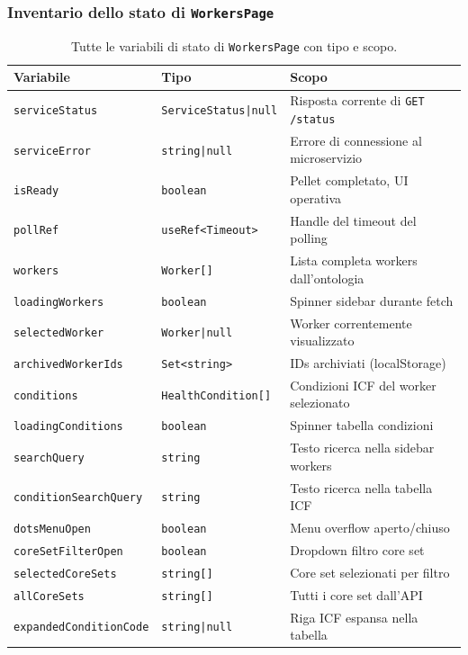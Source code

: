 \documentclass[a4paper,12pt]{article}
\begin{document}
\subsubsection{Inventario dello stato di \texttt{WorkersPage}}

\begin{table}[H]
\centering\small
\caption{Tutte le variabili di stato di \texttt{WorkersPage} con tipo e scopo.}
\begin{tabular}{L{4.8cm} L{3.5cm} L{4.7cm}}
\toprule
\textbf{Variabile} & \textbf{Tipo} & \textbf{Scopo} \\
\midrule
\texttt{serviceStatus} & \texttt{ServiceStatus|null} & Risposta corrente di \texttt{GET /status} \\
\texttt{serviceError} & \texttt{string|null} & Errore di connessione al microservizio \\
\texttt{isReady} & \texttt{boolean} & Pellet completato, UI operativa \\
\texttt{pollRef} & \texttt{useRef<Timeout>} & Handle del timeout del polling \\
\texttt{workers} & \texttt{Worker[]} & Lista completa workers dall'ontologia \\
\texttt{loadingWorkers} & \texttt{boolean} & Spinner sidebar durante fetch \\
\texttt{selectedWorker} & \texttt{Worker|null} & Worker correntemente visualizzato \\
\texttt{archivedWorkerIds} & \texttt{Set<string>} & IDs archiviati (localStorage) \\
\texttt{conditions} & \texttt{HealthCondition[]} & Condizioni ICF del worker selezionato \\
\texttt{loadingConditions} & \texttt{boolean} & Spinner tabella condizioni \\
\texttt{searchQuery} & \texttt{string} & Testo ricerca nella sidebar workers \\
\texttt{conditionSearchQuery} & \texttt{string} & Testo ricerca nella tabella ICF \\
\texttt{dotsMenuOpen} & \texttt{boolean} & Menu overflow aperto/chiuso \\
\texttt{coreSetFilterOpen} & \texttt{boolean} & Dropdown filtro core set \\
\texttt{selectedCoreSets} & \texttt{string[]} & Core set selezionati per filtro \\
\texttt{allCoreSets} & \texttt{string[]} & Tutti i core set dall'API \\
\texttt{expandedConditionCode} & \texttt{string|null} & Riga ICF espansa nella tabella \\

\end{tabular}
\end{table}
\end{document}
